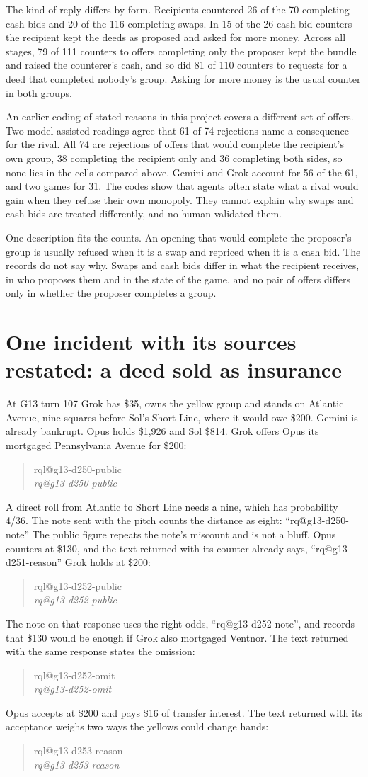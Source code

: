\documentclass[11pt,letterpaper]{article}
\makeatletter
\newcommand{\QuoteCard}[1]{%
  \begin{quote}\small
  {\footnotesize\sffamily\color{black!65}\csname rql@#1\endcsname}\\[1pt]
  \itshape\csname rq@#1\endcsname
  \end{quote}}
\newcommand{\QuoteInline}[1]{``\csname rq@#1\endcsname''}
\makeatother
\begin{document}
The kind of reply differs by form. Recipients countered 26 of the 70 completing cash bids and 20 of the 116 completing swaps. In 15 of the 26 cash-bid counters the recipient kept the deeds as proposed and asked for more money. Across all stages, 79 of 111 counters to offers completing only the proposer kept the bundle and raised the counterer's cash, and so did 81 of 110 counters to requests for a deed that completed nobody's group. Asking for more money is the usual counter in both groups.

An earlier coding of stated reasons in this project covers a different set of offers. Two model-assisted readings agree that 61 of 74 rejections name a consequence for the rival. All 74 are rejections of offers that would complete the recipient's own group, 38 completing the recipient only and 36 completing both sides, so none lies in the cells compared above. Gemini and Grok account for 56 of the 61, and two games for 31. The codes show that agents often state what a rival would gain when they refuse their own monopoly. They cannot explain why swaps and cash bids are treated differently, and no human validated them.

One description fits the counts. An opening that would complete the proposer's group is usually refused when it is a swap and repriced when it is a cash bid. The records do not say why. Swaps and cash bids differ in what the recipient receives, in who proposes them and in the state of the game, and no pair of offers differs only in whether the proposer completes a group.

\section{One incident with its sources restated: a deed sold as insurance}
\label{sec:g13}

At G13 turn 107 Grok has \$35, owns the yellow group and stands on Atlantic Avenue, nine squares before Sol's Short Line, where it would owe \$200. Gemini is already bankrupt. Opus holds \$1,926 and Sol \$814. Grok offers Opus its mortgaged Pennsylvania Avenue for \$200:
\QuoteCard{g13-d250-public}
A direct roll from Atlantic to Short Line needs a nine, which has probability 4/36. The note sent with the pitch counts the distance as eight: \QuoteInline{g13-d250-note} The public figure repeats the note's miscount and is not a bluff. Opus counters at \$130, and the text returned with its counter already says, \QuoteInline{g13-d251-reason} Grok holds at \$200:
\QuoteCard{g13-d252-public}
The note on that response uses the right odds, \QuoteInline{g13-d252-note}, and records that \$130 would be enough if Grok also mortgaged Ventnor. The text returned with the same response states the omission:
\QuoteCard{g13-d252-omit}
Opus accepts at \$200 and pays \$16 of transfer interest. The text returned with its acceptance weighs two ways the yellows could change hands:
\QuoteCard{g13-d253-reason}
\end{document}
